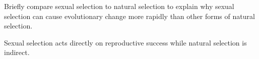 \question[5]
Briefly compare sexual selection to natural selection to explain why sexual selection can cause evolutionary change more rapidly than other forms of natural selection.

\begin{solution}
Sexual selection acts directly on reproductive success while natural selection is indirect.
\end{solution}
